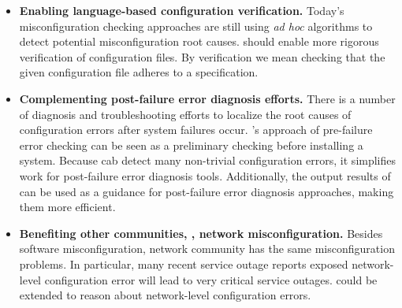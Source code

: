 \begin{itemize}

\item {\bf Enabling language-based configuration verification.}
  Today's misconfiguration checking approaches are still using {\em ad hoc}
  algorithms to detect potential misconfiguration root causes. \app 
  should enable more rigorous verification of configuration files. By verification we
  mean checking that the given configuration file adheres to a
  specification.

\item {\bf Complementing post-failure error diagnosis efforts.}
  There is a number of diagnosis and troubleshooting efforts to localize
  the root causes of configuration errors after system failures occur.
  \app's approach of pre-failure error checking
  can be seen as a preliminary checking before installing a
  system. Because \app cab detect many non-trivial
  configuration errors, it simplifies work for
  post-failure error diagnosis tools. Additionally, the output results
  of \app can be used as a guidance for post-failure
  error diagnosis approaches, making them more efficient.

\item {\bf Benefiting other communities, \eg, network misconfiguration.} 
  Besides software misconfiguration, network community has the same 
  misconfiguration problems. In particular, many recent service outage 
  reports exposed network-level configuration error will lead to
  very critical service outages. \app could be extended to reason about
  network-level configuration errors.

\end{itemize}

